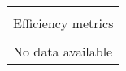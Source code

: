 \begin{tabular}{l}
\toprule\\
Efficiency metrics\\
\midrule\\
No data available\\
\bottomrule
\end{tabular}
